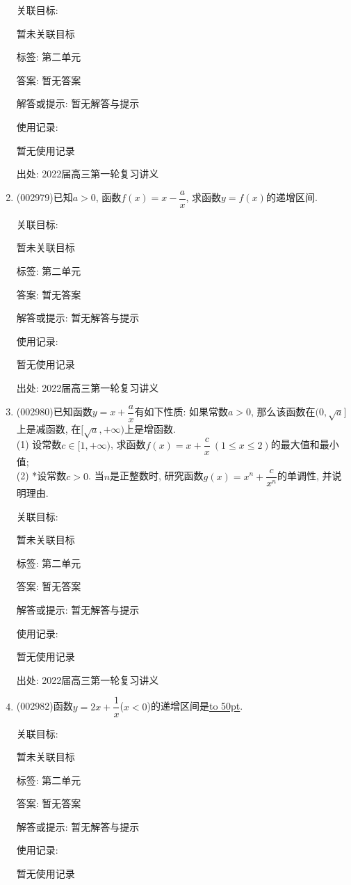 \documentclass[10pt,a4paper]{article}
\newcommand{\blank}[1]{\underline{\hbox to #1pt{}}}
\begin{document}
\begin{enumerate}[1.]
关联目标:

暂未关联目标



标签: 第二单元

答案: 暂无答案

解答或提示: 暂无解答与提示

使用记录:

暂无使用记录


出处: 2022届高三第一轮复习讲义
\item { (002979)}已知$a>0$, 函数$f(x)=x-\dfrac ax$, 求函数$y=f(x)$的递增区间.


关联目标:

暂未关联目标



标签: 第二单元

答案: 暂无答案

解答或提示: 暂无解答与提示

使用记录:

暂无使用记录


出处: 2022届高三第一轮复习讲义
\item { (002980)}已知函数$y=x+\dfrac ax$有如下性质: 如果常数$a>0$, 那么该函数在$(0, \sqrt a]$上是减函数, 在$[\sqrt a, +\infty)$上是增函数.\\
(1) 设常数$c\in [1,+\infty)$, 求函数$f(x)=x+\dfrac cx \ (1\le x\le 2)$的最大值和最小值;\\
(2) *设常数$c>0$. 当$n$是正整数时, 研究函数$g(x)=x^n+\dfrac c{x^n}$的单调性, 并说明理由.


关联目标:

暂未关联目标



标签: 第二单元

答案: 暂无答案

解答或提示: 暂无解答与提示

使用记录:

暂无使用记录


出处: 2022届高三第一轮复习讲义
\item { (002982)}函数$y=2x+\dfrac 1x$($x<0$)的递增区间是\blank{50}.


关联目标:

暂未关联目标



标签: 第二单元

答案: 暂无答案

解答或提示: 暂无解答与提示

使用记录:

暂无使用记录



\end{enumerate}
\end{document}

